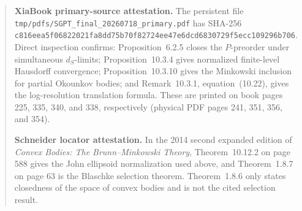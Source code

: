 \begin{quote}
\textbf{XiaBook primary-source attestation.}
The persistent file \texttt{tmp/pdfs/SGPT\_final\_20260718\_primary.pdf}
has SHA-256
\texttt{c816eea5f06822021fa8dd75b70f82724ee47e6dcd6830729f5ecc109296b706}.
Direct inspection confirms: Proposition~6.2.5 closes the \(P\)-preorder
under simultaneous \(d_S\)-limits; Proposition~10.3.4 gives normalized
finite-level Hausdorff convergence; Proposition~10.3.10 gives the
Minkowski inclusion for partial Okounkov bodies; and Remark~10.3.1,
equation~(10.22), gives the log-resolution translation formula.
These are printed on book pages 225, 335, 340, and 338, respectively
(physical PDF pages 241, 351, 356, and 354).

\textbf{Schneider locator attestation.}
In the 2014 second expanded edition of \emph{Convex Bodies: The
Brunn--Minkowski Theory}, Theorem~10.12.2 on page 588 gives the John
ellipsoid normalization used above, and Theorem~1.8.7 on page 63 is the
Blaschke selection theorem.  Theorem~1.8.6 only states closedness of the
space of convex bodies and is not the cited selection result.
\end{quote}
